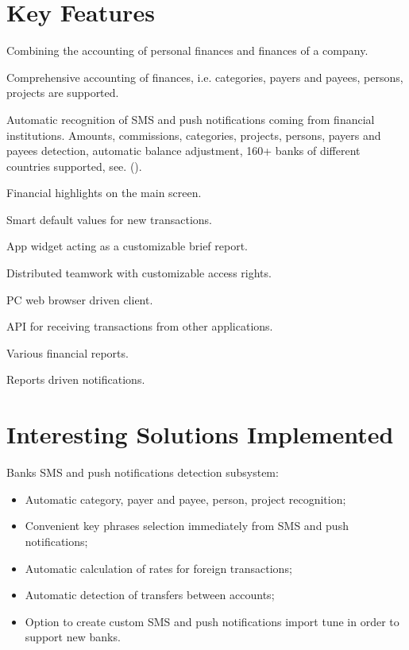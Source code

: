 \documentclass[a4paper,10pt,english]{sphinxmanual}
\begin{document}
\noindent{}


\section{Key Features}
\label{\detokenize{about:key-features}}
Combining the accounting of personal finances and finances of a company.

Comprehensive accounting of finances, i.e. categories, payers and payees, persons, projects are supported.

Automatic recognition of SMS and push notifications coming from financial institutions. Amounts, commissions, categories, projects, persons,
payers and payees detection, automatic balance adjustment, 160+ banks of different countries supported,
see. {\hyperref[\detokenize{banks:chapter-supported-banks}]{}} ().

Financial highlights on the main screen.

Smart default values for new transactions.

App widget acting as a customizable brief report.

Distributed teamwork with customizable access rights.

PC web browser driven client.

API for receiving transactions from other applications.

Various financial reports.

Reports driven notifications.


\section{Interesting Solutions Implemented}
\label{\detokenize{about:interesting-solutions-implemented}}
Banks SMS and push notifications detection subsystem:
\begin{itemize}
\item {} 
Automatic category, payer and payee, person, project recognition;

\item {} 
Convenient key phrases selection immediately from SMS and push notifications;

\item {} 
Automatic calculation of rates for foreign transactions;

\item {} 
Automatic detection of transfers between accounts;

\item {} 
Option to create custom SMS and push notifications import tune in order to support new banks.

\end{itemize}
\end{document}
